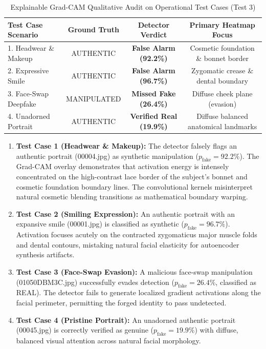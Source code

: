\documentclass[journal]{IEEEtran}
\begin{document}
\begin{table}[t]
\caption{Explainable Grad-CAM Qualitative Audit on Operational Test Cases (Test 3)}
\label{tab:gradcam_audit}
\centering
\footnotesize
\begin{tabular*}{\columnwidth}{@{\extracolsep{\fill}}lccc@{}}
\toprule
\textbf{Test Case Scenario} & \textbf{Ground Truth} & \textbf{Detector Verdict} & \textbf{Primary Heatmap Focus} \\
\midrule
1. Headwear \& Makeup & AUTHENTIC & \textcolor{sevhigh}{\textbf{False Alarm (92.2\%)}} & Cosmetic foundation \& bonnet border \\
2. Expressive Smile & AUTHENTIC & \textcolor{sevhigh}{\textbf{False Alarm (96.7\%)}} & Zygomatic crease \& dental boundary \\
3. Face-Swap Deepfake & MANIPULATED & \textcolor{sevhigh}{\textbf{Missed Fake (26.4\%)}} & Diffuse cheek plane (evasion) \\
4. Unadorned Portrait & AUTHENTIC & \textcolor{sevlow}{\textbf{Verified Real (19.9\%)}} & Diffuse balanced anatomical landmarks \\
\bottomrule
\end{tabular*}
\vspace{2pt}
\end{table}

\begin{enumerate}
    \item \textbf{Test Case 1 (Headwear \& Makeup):} The detector falsely flags an authentic portrait (00004.jpg) as synthetic manipulation ($p_{\text{fake}} = 92.2\%$). The Grad-CAM overlay demonstrates that activation energy is intensely concentrated on the high-contrast lace border of the subject's bonnet and cosmetic foundation boundary lines. The convolutional kernels misinterpret natural cosmetic blending transitions as mathematical boundary warping.
    \item \textbf{Test Case 2 (Smiling Expression):} An authentic portrait with an expansive smile (00001.jpg) is classified as synthetic ($p_{\text{fake}} = 96.7\%$). Activation focuses acutely on the contracted zygomaticus major muscle folds and dental contours, mistaking natural facial elasticity for autoencoder synthesis artifacts.
    \item \textbf{Test Case 3 (Face-Swap Evasion):} A malicious face-swap manipulation (01050DBM3C.jpg) successfully evades detection ($p_{\text{fake}} = 26.4\%$, classified as REAL). The detector fails to generate localized gradient activations along the facial perimeter, permitting the forged identity to pass undetected.
    \item \textbf{Test Case 4 (Pristine Portrait):} An unadorned authentic portrait (00045.jpg) is correctly verified as genuine ($p_{\text{fake}} = 19.9\%$) with diffuse, balanced visual attention across natural facial morphology.
\end{enumerate}
\end{document}
